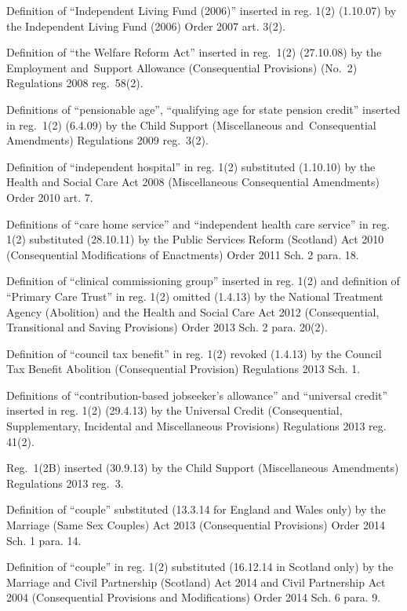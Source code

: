 \documentclass[12pt,a4paper]{article}
\begin{document}
{Definition of ``Independent Living Fund (2006)'' inserted in reg. 1(2) (1.10.07) by the Independent Living Fund (2006) Order 2007 art. 3(2).

Definition of ``the Welfare Reform Act'' inserted in reg.~1(2) (27.10.08) by the Employment and~Support Allowance (Consequential Provisions) (No.~2) Regulations 2008 reg.~58(2).

Definitions of ``pensionable age'', ``qualifying age for state pension credit'' inserted in reg.~1(2)
(6.4.09) by the Child Support (Miscellaneous and~Consequential Amendments) Regulations 2009 reg.~3(2).

Definition of ``independent hospital'' in reg. 1(2) substituted (1.10.10) by the Health and Social Care Act 2008 (Miscellaneous Consequential Amendments) Order 2010 art. 7.

Definitions of ``care home service'' and ``independent health care service'' in reg. 1(2) substituted (28.10.11) by the Public Services Reform (Scotland) Act 2010 (Consequential Modifications of Enactments) Order 2011 Sch. 2 para. 18.

Definition of ``clinical commissioning group'' inserted in reg. 1(2) and definition of ``Primary Care Trust'' in reg. 1(2) omitted (1.4.13) by the National Treatment Agency (Abolition) and the Health and Social Care Act 2012 (Consequential, Transitional and Saving Provisions) Order 2013 Sch. 2 para. 20(2).

Definition of ``council tax benefit'' in reg. 1(2) revoked (1.4.13) by the Council Tax Benefit Abolition (Consequential Provision) Regulations 2013 Sch. 1.

Definitions of ``contribution-based jobseeker's allowance'' and ``universal credit'' inserted in reg. 1(2) (29.4.13) by the Universal Credit (Consequential, Supplementary, Incidental and Miscellaneous Provisions) Regulations 2013 reg. 41(2).

Reg.~1(2B) inserted (30.9.13) by the Child Support (Miscellaneous Amendments) Regulations 2013 reg.~3.

Definition of ``couple'' substituted (13.3.14 for England and Wales only) by the Marriage (Same Sex Couples) Act 2013 (Consequential Provisions) Order 2014 Sch. 1 para. 14.

Definition of ``couple'' in reg. 1(2) substituted (16.12.14 in Scotland only) by the Marriage and Civil Partnership (Scotland) Act 2014 and Civil Partnership Act 2004 (Consequential Provisions and Modifications) Order 2014 Sch. 6 para. 9.

}
\end{document}
